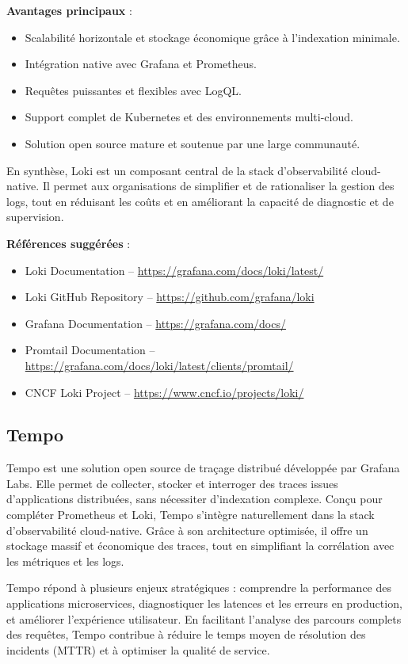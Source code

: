 \textbf{Avantages principaux} :
\begin{itemize}
	\item Scalabilité horizontale et stockage économique grâce à l’indexation minimale.
	\item Intégration native avec Grafana et Prometheus.
	\item Requêtes puissantes et flexibles avec LogQL.
	\item Support complet de Kubernetes et des environnements multi-cloud.
	\item Solution open source mature et soutenue par une large communauté.
\end{itemize}

En synthèse, Loki est un composant central de la stack d’observabilité cloud-native. Il permet aux organisations de simplifier et de rationaliser la gestion des logs, tout en réduisant les coûts et en améliorant la capacité de diagnostic et de supervision.

\textbf{Références suggérées} :
\begin{itemize}
	\item Loki Documentation – \url{https://grafana.com/docs/loki/latest/}
	\item Loki GitHub Repository – \url{https://github.com/grafana/loki}
	\item Grafana Documentation – \url{https://grafana.com/docs/}
	\item Promtail Documentation – \url{https://grafana.com/docs/loki/latest/clients/promtail/}
	\item CNCF Loki Project – \url{https://www.cncf.io/projects/loki/}
\end{itemize}

\subsection{Tempo}

Tempo est une solution open source de traçage distribué développée par Grafana Labs. Elle permet de collecter, stocker et interroger des traces issues d’applications distribuées, sans nécessiter d’indexation complexe. Conçu pour compléter Prometheus et Loki, Tempo s’intègre naturellement dans la stack d’observabilité cloud-native. Grâce à son architecture optimisée, il offre un stockage massif et économique des traces, tout en simplifiant la corrélation avec les métriques et les logs.

Tempo répond à plusieurs enjeux stratégiques  : comprendre la performance des applications microservices, diagnostiquer les latences et les erreurs en production, et améliorer l’expérience utilisateur. En facilitant l’analyse des parcours complets des requêtes, Tempo contribue à réduire le temps moyen de résolution des incidents (MTTR) et à optimiser la qualité de service.

